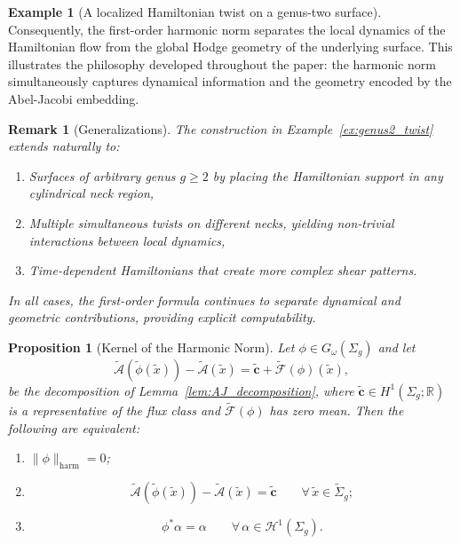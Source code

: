 \documentclass[11pt]{article}
\newtheorem{proposition}[theorem]{Proposition}
\newtheorem{remark}[theorem]{Remark}
\theoremstyle{definition}
\newtheorem{example}[theorem]{Example}
\begin{document}
\begin{example}[A localized Hamiltonian twist on a genus-two surface]
		Consequently, the first-order harmonic norm separates the local dynamics of the
		Hamiltonian flow from the global Hodge geometry of the underlying surface. This
		illustrates the philosophy developed throughout the paper: the harmonic norm
		simultaneously captures dynamical information and the geometry encoded by the
		Abel-Jacobi embedding.
	\end{example}
	
	
	
	
	\begin{remark}[Generalizations]
		The construction in Example~\ref{ex:genus2_twist} extends naturally to:
		\begin{enumerate}
			\item Surfaces of arbitrary genus $g \ge 2$ by placing the 
			Hamiltonian support in any cylindrical neck region,
			\item Multiple simultaneous twists on different necks, yielding 
			non-trivial interactions between local dynamics,
			\item Time-dependent Hamiltonians that create more complex shear 
			patterns.
		\end{enumerate}
		In all cases, the first-order formula continues to separate dynamical 
		and geometric contributions, providing explicit computability.
	\end{remark}
	
	
	
	
	\begin{proposition}[Kernel of the Harmonic Norm]
		\label{prop:kernel}
		Let $\phi\in G_\omega(\Sigma_g)$ and let
		\[
		\widetilde{\mathcal A}(\widetilde\phi(\tilde x))
		-
		\widetilde{\mathcal A}(\tilde x)
		=
		\widetilde{\mathbf c}
		+
		\widetilde{\mathcal F}(\phi)(\tilde x),
		\]
		be the decomposition of Lemma~\ref{lem:AJ_decomposition}, where
		$\widetilde{\mathbf c}\in H^1(\Sigma_g;\mathbb R)$ is a representative of the
		flux class and $\widetilde{\mathcal F}(\phi)$ has zero mean. Then the following
		are equivalent:
		
		\begin{enumerate}
			\item $\|\phi\|_{\mathrm{harm}}=0$;
			
			\item
			\[
			\widetilde{\mathcal A}(\widetilde\phi(\tilde x))
			-
			\widetilde{\mathcal A}(\tilde x)
			=
			\widetilde{\mathbf c}
			\qquad
			\forall\,\tilde x\in\widetilde{\Sigma}_g;
			\]
			
			\item
			\[
			\phi^*\alpha=\alpha
			\qquad
			\forall\,\alpha\in\mathcal H^1(\Sigma_g).
			\]
		\end{enumerate}
	\end{proposition}
	
\end{document}
